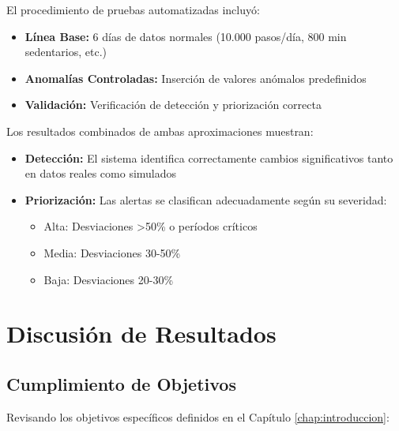El procedimiento de pruebas automatizadas incluyó:

\begin{itemize}
    \item \textbf{Línea Base:} 6 días de datos normales (10.000 pasos/día, 800 min sedentarios, etc.)
    \item \textbf{Anomalías Controladas:} Inserción de valores anómalos predefinidos
    \item \textbf{Validación:} Verificación de detección y priorización correcta
\end{itemize}

Los resultados combinados de ambas aproximaciones muestran:

\begin{itemize}
    \item \textbf{Detección:} El sistema identifica correctamente cambios significativos tanto en datos reales como simulados
    \item \textbf{Priorización:} Las alertas se clasifican adecuadamente según su severidad:
        \begin{itemize}
            \item Alta: Desviaciones >50\% o períodos críticos
            \item Media: Desviaciones 30-50\%
            \item Baja: Desviaciones 20-30\%
        \end{itemize}
\end{itemize}

\section{Discusión de Resultados}
\label{sec:discusion}

\subsection{Cumplimiento de Objetivos}
\label{subsec:cumplimiento_objetivos}

Revisando los objetivos específicos definidos en el Capítulo \ref{chap:introduccion}:

